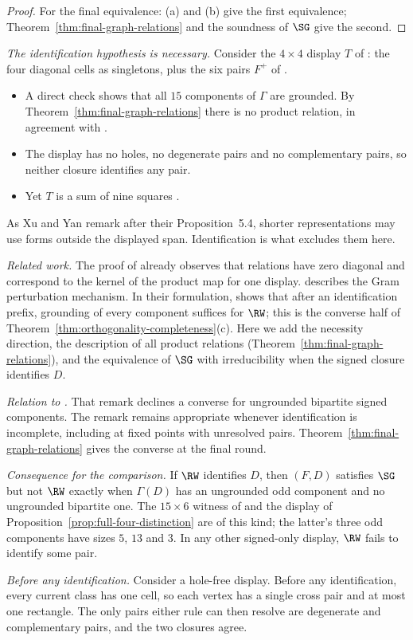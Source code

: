 \begin{proof}
For the final equivalence: (a) and (b) give the first equivalence;
Theorem~\ref{thm:final-graph-relations} and the soundness of $\SG$
\cite[Theorem~7.2]{LQ} give the second.
\end{proof}

\begin{remark}\label{rem:final-graph}
\emph{The identification hypothesis is necessary.} Consider the
$4\times4$ display $T$ of \cite[(40)]{XY}: the four diagonal cells as
singletons, plus the six pairs $F^+$ of \cite[(38)]{XY}.
\begin{itemize}
\item A direct check shows that all $15$ components of $\Gamma$ are
      grounded. By Theorem~\ref{thm:final-graph-relations} there is no
      product relation, in agreement with \cite[Proposition~5.4]{XY}.
\item The display has no holes, no degenerate pairs and no complementary
      pairs, so neither closure identifies any pair.
\item Yet $T$ is a sum of nine squares \cite[Theorem~5.3]{XY}.
\end{itemize}
As Xu and Yan remark after their Proposition~5.4, shorter representations
may use forms outside the displayed span. Identification is what excludes
them here.

\emph{Related work.} The proof of \cite[Proposition~5.4]{XY} already
observes that relations have zero diagonal and correspond to the kernel of
the product map for one display. \cite[Remark~7.8]{LQ} describes the Gram
perturbation mechanism. In their formulation,
\cite[Proposition~2.3]{CLQIncidence} shows that after an identification
prefix, grounding of every component suffices for $\RW$; this is the
converse half of Theorem~\ref{thm:orthogonality-completeness}(c).
Here we add the necessity direction, the description of all product
relations (Theorem~\ref{thm:final-graph-relations}), and the equivalence
of $\SG$ with irreducibility when the signed closure identifies $D$.

\emph{Relation to \cite[Remark~7.8]{LQ}.} That remark declines a converse
for ungrounded bipartite signed components. The remark remains appropriate
whenever identification is incomplete, including at fixed points with
unresolved pairs. Theorem~\ref{thm:final-graph-relations} gives the
converse at the final round.

\emph{Consequence for the comparison.} If $\RW$ identifies $D$, then
$(F,D)$ satisfies $\SG$ but not $\RW$ exactly when $\Gamma(D)$ has an
ungrounded odd component and no ungrounded bipartite one. The $15\times6$
witness of \cite[Theorem~7.5]{LQ} and the display of
Proposition~\ref{prop:full-four-distinction} are of this kind; the latter's
three odd components have sizes $5$, $13$ and $3$. In any other
signed-only display, $\RW$ fails to identify some pair.

\emph{Before any identification.} Consider a hole-free display. Before
any identification, every current class has one cell, so each vertex has a single
cross pair and at most one rectangle. The only pairs either rule can then
resolve are degenerate and complementary pairs, and the two closures agree.

\end{remark}
